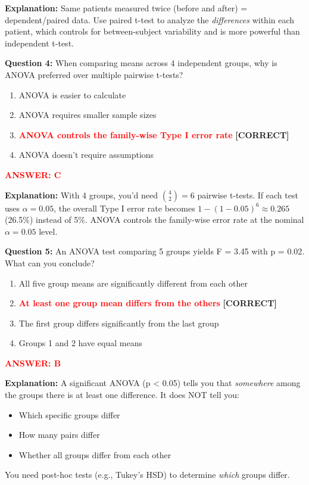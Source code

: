 \documentclass[11pt]{article}
\begin{document}
\textbf{Explanation:} Same patients measured twice (before and after) = dependent/paired data. Use paired t-test to analyze the \textit{differences} within each patient, which controls for between-subject variability and is more powerful than independent t-test.

\vspace{0.5cm}

\textbf{Question 4:} When comparing means across 4 independent groups, why is ANOVA preferred over multiple pairwise t-tests?

\begin{enumerate}[label=\Alph*.]
\item ANOVA is easier to calculate
\item ANOVA requires smaller sample sizes
\item \textcolor{red}{\textbf{ANOVA controls the family-wise Type I error rate}} \textbf{[CORRECT]}
\item ANOVA doesn't require assumptions
\end{enumerate}

\textcolor{red}{\textbf{ANSWER: C}}

\textbf{Explanation:} With 4 groups, you'd need ${4 \choose 2} = 6$ pairwise t-tests. If each test uses $\alpha = 0.05$, the overall Type I error rate becomes $1 - (1-0.05)^6 \approx 0.265$ (26.5\%) instead of 5\%. ANOVA controls the family-wise error rate at the nominal $\alpha = 0.05$ level.

\vspace{0.5cm}

\textbf{Question 5:} An ANOVA test comparing 5 groups yields F = 3.45 with p = 0.02. What can you conclude?

\begin{enumerate}[label=\Alph*.]
\item All five group means are significantly different from each other
\item \textcolor{red}{\textbf{At least one group mean differs from the others}} \textbf{[CORRECT]}
\item The first group differs significantly from the last group
\item Groups 1 and 2 have equal means
\end{enumerate}

\textcolor{red}{\textbf{ANSWER: B}}

\textbf{Explanation:} A significant ANOVA (p < 0.05) tells you that \textit{somewhere} among the groups there is at least one difference. It does NOT tell you:
\begin{itemize}
\item Which specific groups differ
\item How many pairs differ
\item Whether all groups differ from each other
\end{itemize}
You need post-hoc tests (e.g., Tukey's HSD) to determine \textit{which} groups differ.
\end{document}
